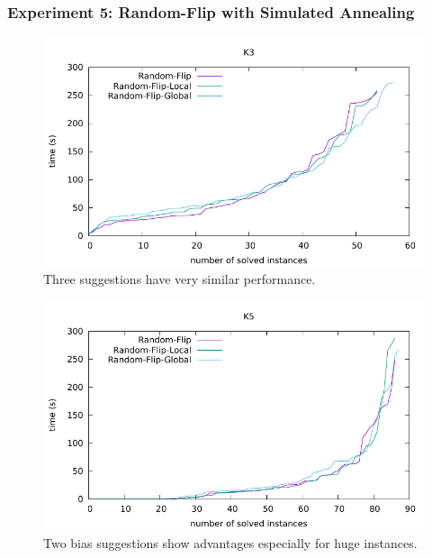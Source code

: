 \documentclass[12pt,a4paper,twoside]{scrartcl}
\numberwithin{equation}{section}
\begin{document}
\subsubsection{Experiment 5: Random-Flip with Simulated Annealing} 
  \begin{figure}[H]
\begin{center}
  \includegraphics[scale = 1]{DATA/K3/e3r.pdf}
  \end{center}
  \caption{Three suggestions have very similar performance.}
  \label{Experiment 5 k3-r cactus plot}
  \end{figure}
  \begin{figure}[H]
\begin{center}
  \includegraphics[scale = 1]{DATA/K5/e3r.pdf}
  \end{center}
  \caption{Two bias suggestions show advantages especially for huge instances.}
  \label{Experiment 5 k5-r cactus plot}
  \end{figure}
\end{document}
